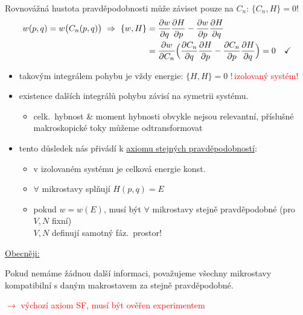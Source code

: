 \begin{veta}[Důsledek]
Rovnovážná hustota pravděpodobnosti může záviset pouze na  $C_n$: \quad $\{C_n,H\} = 0$!
\begin{align*}
  w(p,q) = w\big(C_n(p,q)\big) \ \Rightarrow\ \{w,H\} &= \pdv{w}{q}\pdv{H}{p} - \pdv{w}{p}\pdv{H}{q} \\
  &= \pdv{w}{C_n}\Big(\pdv{C_n}{q}\pdv{H}{p} - \pdv{C_n}{p}\pdv{H}{q}\Big) = 0 \quad\checkmark
\end{align*}
\end{veta}
\begin{itemize}
  \item takovým integrálem pohybu je vždy energie: \quad $\{H,H\} = 0$ \qquad \textcolor{Red}{!\,izolovaný systém!}
  \item existence dalších integrálů pohybu závisí na symetrii systému.
  \begin{itemize}
    \item[--] celk.\ hybnost \& moment hybnosti obvykle nejsou relevantní, příslušné makroskopické toky můžeme odtransformovat
  \end{itemize}
\end{itemize}

\begin{itemize}
  \item tento důsledek nás přivádí k \underline{axiomu stejných pravděpodobností}:
  \begin{itemize}
    \item[$\to$] v izolovaném systému je celková energie konst.
    \item[$\Rightarrow$] $\forall$ mikrostavy splňují $H(p,q) = E$
    \item[$\Rightarrow$] pokud $w = w(E)$, musí být $\forall$ mikrostavy stejně pravděpodobné (pro \underline{$V,N$} fixní) \\
          \hfill \textcolor{NavyBlue}{$V,N$ definují samotný fáz.\ prostor!}
  \end{itemize}
\end{itemize}

\underline{Obecněji:}
\begin{veta}
Pokud nemáme žádnou další informaci, považujeme všechny mikrostavy kompatibilní s daným makrostavem za stejně pravděpodobné.

\textcolor{Red}{$\to$ výchozí axiom SF, musí být ověřen experimentem}
\end{veta}

